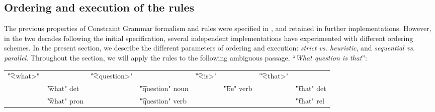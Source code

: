\subsection{Ordering and execution of the rules}\label{sec:ordering}

The previous properties of Constraint Grammar formalism and rules were specified in \cite{karlsson1995constraint}, and retained in further implementations. 
However, in the two decades following the initial specification, 
several independent implementations have experimented with different ordering
schemes. In the present section, we describe the different parameters of ordering and execution: \emph{strict vs. heuristic}, and \emph{sequential vs. parallel}.
%
%
%
Throughout the section, we will apply the rules to the following ambiguous passage, ``{\em What question is that}'':

\begin{tabular}{p{0.6cm} l  p{0.6cm} l p{0.6cm} l p{0.6cm} l}
\t{"<what>"}     &                      &  \t{"<question>"}        &  & \t{"<is>"}         & & \t{"<that>"} \\
                 & \t{"what" det}       & &      \t{"question" noun}  &  &    \t{"be" verb}  & &    \t{"that" det}  \\
                 & \t{"what" pron}      & &      \t{"question" verb}  &  &                   & &    \t{"that" rel} \\
\end{tabular}

